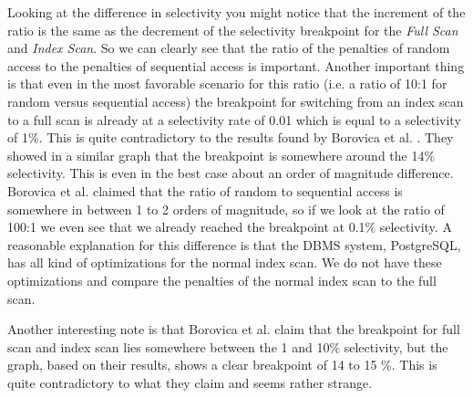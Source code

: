 \documentclass[a4paper,11pt,twoside]{article}
\begin{document}
Looking at the difference in selectivity you might notice that the increment of the ratio is the same as the decrement of the selectivity breakpoint for the  \textit{Full Scan} and \textit{Index Scan}. So we can clearly see that the ratio of the penalties of random access to the penalties of sequential access is important. Another important thing is that even in the most favorable scenario for this ratio (i.e. a ratio of 10:1 for random versus sequential access) the breakpoint for switching from an index scan to a full scan is already at a selectivity rate of 0.01 which is equal to a selectivity of 1$\%$. This is quite contradictory to the results found by Borovica et al. \cite{smoothscan}. They showed in a similar graph that the breakpoint is somewhere around the 14$\%$ selectivity. This is even in the best case about an order of magnitude difference. Borovica et al. claimed that the ratio of random to sequential access is somewhere in between 1 to 2 orders of magnitude, so if we look at the ratio of 100:1 we even see that we already reached the breakpoint at 0.1$\%$ selectivity. A reasonable explanation for this difference is that the DBMS system, PostgreSQL, has all kind of optimizations for the normal index scan. We do not have these optimizations and compare the penalties of the normal index scan to the full scan. 

Another interesting note is that Borovica et al. \cite{smoothscan} claim that the breakpoint for full scan and index scan lies somewhere between the 1 and 10$\%$ selectivity, but the graph, based on their results, shows a clear breakpoint of 14 to 15 $\%$. This is quite contradictory to what they claim and seems rather strange.
\end{document}
